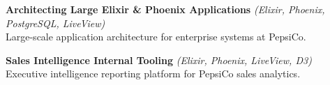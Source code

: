 \textbf{Architecting Large Elixir \& Phoenix Applications} \textit{(Elixir, Phoenix, PostgreSQL, LiveView)}\\
Large-scale application architecture for enterprise systems at PepsiCo.
\vspace{0.3em}

\textbf{Sales Intelligence Internal Tooling} \textit{(Elixir, Phoenix, LiveView, D3)}\\
Executive intelligence reporting platform for PepsiCo sales analytics.
